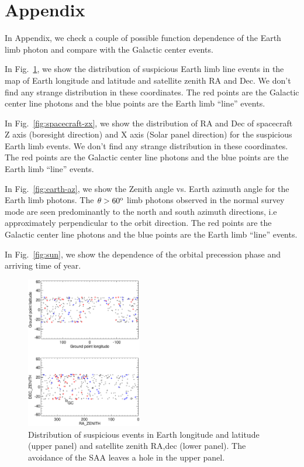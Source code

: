 \documentclass[aps,twocolumn,prd,superscriptaddress,showpacs,nofootinbib,fixfloat]{revtex4}
\newcommand{\degree}{^{\rm o}}
\begin{document}
\appendix
\section{Appendix}

In Appendix, we check a couple of possible function
dependence of the Earth limb photon and compare with the
Galactic center events. 

In Fig.~\ref{fig:geo-lonlat}, we show the distribution of
suspicious Earth limb line events in the map of Earth
longitude and latitude and satellite zenith RA and Dec. We
don't find any strange distribution in these
coordinates. The red points are the Galactic center line
photons and the blue points are the Earth limb ``line''
events.

In Fig.~\ref{fig:spacecraft-zx}, we show the distribution of
RA and Dec of spacecraft Z axis (boresight direction) and X
axis (Solar panel direction) for the suspicious Earth limb
events. We don't find any strange distribution in these
coordinates. The red points are the Galactic center line
photons and the blue points are the Earth limb ``line''
events.

In Fig.~\ref{fig:earth-az}, we show the Zenith angle
vs. Earth azimuth angle for the Earth limb photons. The
$\theta > 60\degree$ limb photons observed in the normal
survey mode are seen predominantly to the north and south
azimuth directions, i.e approximately perpendicular to the
orbit direction. The red points are the Galactic center line
photons and the blue points are the Earth limb ``line''
events.

In Fig.~\ref{fig:sun}, we show the dependence of the orbital
precession phase and arriving time of year.



\begin{figure}
  \centering
  \includegraphics[width=0.45\textwidth]{plots/geo-lonlat.ps}
  \caption{Distribution of suspicious events in Earth
  longitude and latitude (upper panel) and satellite zenith
  RA,dec (lower panel).   The avoidance of the SAA leaves a
  hole in the upper panel.}
  \label{fig:geo-lonlat}
\end{figure}
\end{document}

